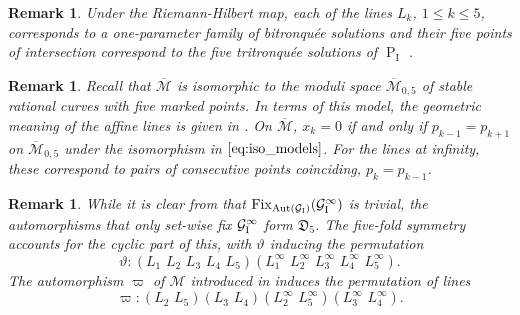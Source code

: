 \documentclass[a4paper,reqno]{amsart}
\numberwithin{equation}{section}
\newcommand{\pain}[1]{\operatorname{P}_{\mathrm{#1}}}
\DeclareMathOperator{\Aut}{Aut}
\newtheorem{remark}[theorem]{Remark}
\numberwithin{equation}{section}
\begin{document}
\begin{remark} \label{rem:monodromylinesexplainedPI}
    Under the Riemann-Hilbert map, each of the lines $L_k$, $1\leq k\leq 5$, corresponds to a one-parameter family of bitronqu\'ee solutions and their five points of intersection correspond to the five  tritronqu\'ee solutions of $\pain{I}$ \cites{kk,kapaev2004}. 
\end{remark}

\begin{remark}
    Recall that $\overline{\mathcal{M}}$ is isomorphic to the moduli space $\overline{\mathcal{M}}_{0,5}$ of stable rational curves with five marked points. 
    In terms of this model, the geometric meaning of the affine lines is given in \cite[Lem. 1]{masoerobethe}.
    On $\overline{\mathcal{M}}$, $x_k=0$ if and only if $p_{k-1}=p_{k+1}$ on $\overline{\mathcal{M}}_{0,5}$ under the isomorphism in $\eqref{eq:iso_models}$. 
    For the lines at infinity, these correspond to pairs of consecutive points coinciding,
    $p_k = p_{k-1}$.
\end{remark}



\begin{remark}
    While it is clear from  that $\operatorname{Fix}_{\Aut(\mathcal{G}_{\rm{I}})}(\mathcal{G}_{\rm{I}}^{\infty})$ is trivial, the automorphisms that only set-wise fix $\mathcal{G}_{\rm{I}}^{\infty}$ form $\mathfrak{D}_5$. 
    The five-fold symmetry accounts for the cyclic part of this, with $\vartheta$ inducing the permutation
    $$\vartheta: (L_1\,\,L_2\,\,L_3\,\,L_4\,\,L_5)(L_1^{\infty}\,\,L_2^{\infty}\,\,L_3^{\infty}\,\,L_4^{\infty}\,\,L_5^{\infty}).$$
    The automorphism $\varpi$ of $\mathcal{M}$  introduced in  induces the permutation of lines 
    $$\varpi: (L_2\,\,L_5)(L_3\,\,L_4)(L_2^{\infty}\,\,L_5^{\infty})(L_3^{\infty}\,\,L_4^{\infty}).$$

    
\end{remark}
\end{document}
